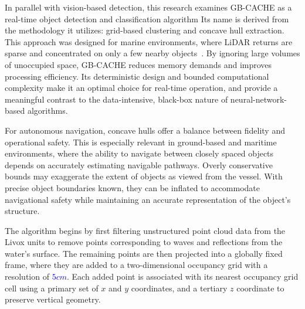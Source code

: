
In parallel with vision-based detection, this research examines GB-CACHE as a real-time object detection and classification algorithm
Its name is derived from the methodology it utilizes: grid-based clustering and concave hull extraction.
This approach was designed for marine environments, where LiDAR returns are sparse and concentrated on only a few nearby objects~\cite{coyleE}.
By ignoring large volumes of unoccupied space, GB-CACHE reduces memory demands and improves processing efficiency.
Its deterministic design and bounded computational complexity make it an optimal choice for real-time operation, and provide a meaningful contrast to the data-intensive, black-box nature of neural-network-based algorithms.

For autonomous navigation, concave hulls offer a balance between fidelity and operational safety.
This is especially relevant in ground-based and maritime environments, where the ability to navigate between closely spaced objects depends on accurately estimating navigable pathways.
Overly conservative bounds may exaggerate the extent of objects as viewed from the vessel.
With precise object boundaries known, they can be inflated to accommodate navigational safety while maintaining an accurate representation of the object's structure.

The algorithm begins by first filtering unstructured point cloud data from the Livox units to remove points corresponding to waves and reflections from the water's surface.
The remaining points are then projected into a globally fixed frame, where they are added to a two-dimensional occupancy grid with a resolution of \textcolor{blue}{$5 cm$}.
Each added point is associated with its nearest occupancy grid cell using a primary set of $x$ and $y$ coordinates, and a tertiary $z$ coordinate to preserve vertical geometry.



